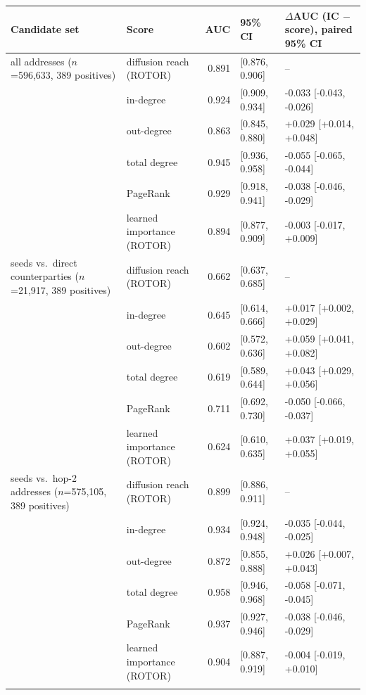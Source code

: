 \begin{tabular}{p{4.0cm}lrll}
\toprule
\textbf{Candidate set} & \textbf{Score} & \textbf{AUC} & \textbf{95\% CI} & \textbf{$\Delta$AUC (IC $-$ score), paired 95\% CI} \\
\midrule
all addresses ($n$=596,633, 389 positives) & diffusion reach (ROTOR) & 0.891 & [0.876, 0.906] & -- \\
 & in-degree & 0.924 & [0.909, 0.934] & -0.033 [-0.043, -0.026] \\
 & out-degree & 0.863 & [0.845, 0.880] & +0.029 [+0.014, +0.048] \\
 & total degree & 0.945 & [0.936, 0.958] & -0.055 [-0.065, -0.044] \\
 & PageRank & 0.929 & [0.918, 0.941] & -0.038 [-0.046, -0.029] \\
 & learned importance (ROTOR) & 0.894 & [0.877, 0.909] & -0.003 [-0.017, +0.009] \\
\addlinespace
seeds vs.\ direct counterparties ($n$=21,917, 389 positives) & diffusion reach (ROTOR) & 0.662 & [0.637, 0.685] & -- \\
 & in-degree & 0.645 & [0.614, 0.666] & +0.017 [+0.002, +0.029] \\
 & out-degree & 0.602 & [0.572, 0.636] & +0.059 [+0.041, +0.082] \\
 & total degree & 0.619 & [0.589, 0.644] & +0.043 [+0.029, +0.056] \\
 & PageRank & 0.711 & [0.692, 0.730] & -0.050 [-0.066, -0.037] \\
 & learned importance (ROTOR) & 0.624 & [0.610, 0.635] & +0.037 [+0.019, +0.055] \\
\addlinespace
seeds vs.\ hop-2 addresses ($n$=575,105, 389 positives) & diffusion reach (ROTOR) & 0.899 & [0.886, 0.911] & -- \\
 & in-degree & 0.934 & [0.924, 0.948] & -0.035 [-0.044, -0.025] \\
 & out-degree & 0.872 & [0.855, 0.888] & +0.026 [+0.007, +0.043] \\
 & total degree & 0.958 & [0.946, 0.968] & -0.058 [-0.071, -0.045] \\
 & PageRank & 0.937 & [0.927, 0.946] & -0.038 [-0.046, -0.029] \\
 & learned importance (ROTOR) & 0.904 & [0.887, 0.919] & -0.004 [-0.019, +0.010] \\
\addlinespace
\bottomrule
\end{tabular}
